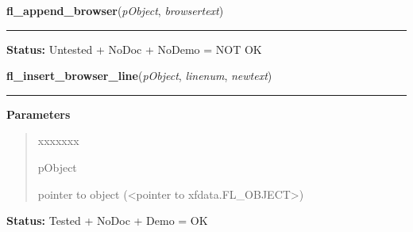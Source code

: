     \vspace{0.5ex}

\hspace{.8\funcindent}\begin{boxedminipage}{\funcwidth}

    \raggedright \textbf{fl\_append\_browser}(\textit{pObject}, \textit{browsertext})

    \vspace{-1.5ex}

    \rule{\textwidth}{0.5\fboxrule}
\setlength{\parskip}{2ex}
\setlength{\parskip}{1ex}
\textbf{Status:} Untested + NoDoc + NoDemo = NOT OK



    \end{boxedminipage}

    \label{xformslib:library:fl_insert_browser_line}

    \vspace{0.5ex}

\hspace{.8\funcindent}\begin{boxedminipage}{\funcwidth}

    \raggedright \textbf{fl\_insert\_browser\_line}(\textit{pObject}, \textit{linenum}, \textit{newtext})

    \vspace{-1.5ex}

    \rule{\textwidth}{0.5\fboxrule}
\setlength{\parskip}{2ex}
\setlength{\parskip}{1ex}
      \textbf{Parameters}
      \vspace{-1ex}

      \begin{quote}
        \begin{Ventry}{xxxxxxx}

          \item[pObject]

          pointer to object ({\textless}pointer to 
          xfdata.FL\_OBJECT{\textgreater})

        \end{Ventry}

      \end{quote}

\textbf{Status:} Tested + NoDoc + Demo = OK



    \end{boxedminipage}

